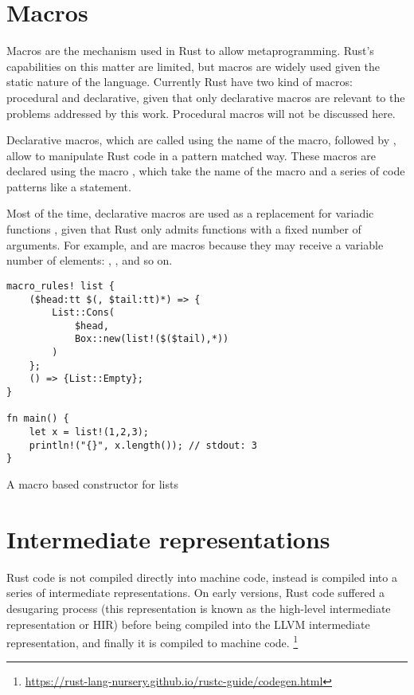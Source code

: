 \section{Macros}

Macros are the mechanism used in Rust to allow metaprogramming. Rust's
capabilities on this matter are limited, but macros are widely used given the
static nature of the language. Currently Rust have two kind of macros:
procedural and declarative, given that only declarative macros are relevant to
the problems addressed by this work. Procedural macros will not be discussed
here.

Declarative macros, which are called using the name of the macro, followed by
\inrust{!}, allow to manipulate Rust code in a pattern matched way. These
macros are declared using the macro , which take the name
of the macro and a series of code patterns like a  statement. 

Most of the time, declarative macros are used as a replacement for variadic functions
, given that Rust only admits functions with a fixed
number of arguments. For example,  and  are macros
because they may receive a variable number of elements: ,
,   and so on.


\begin{listing}[h]
	\begin{verbatim}
macro_rules! list {
    ($head:tt $(, $tail:tt)*) => {
        List::Cons(
            $head, 
            Box::new(list!($($tail),*))
        )
    };
    () => {List::Empty};
}

fn main() {
    let x = list!(1,2,3);
    println!("{}", x.length()); // stdout: 3
}
    \end{verbatim}
  \caption{A macro based constructor for lists}
  \label{lst:declarative_macro}
\end{listing}

\section{Intermediate representations}

Rust code is not compiled directly into machine code, instead is compiled into a
series of intermediate representations. On early versions, Rust code suffered a
desugaring process (this representation is known as the high-level intermediate
representation or HIR) before being compiled into the LLVM intermediate
representation, and finally it is compiled to machine code.
\footnote{\url{https://rust-lang-nursery.github.io/rustc-guide/codegen.html}}

